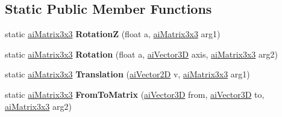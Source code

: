 \subsection*{Static Public Member Functions}
\begin{DoxyCompactItemize}
\item 
\hypertarget{structai_matrix3x3_af9e5446b7a7ad713ef2f2909910f3c0b}{static \hyperlink{structai_matrix3x3}{ai\+Matrix3x3} {\bfseries Rotation\+Z} (float a, \hyperlink{structai_matrix3x3}{ai\+Matrix3x3} arg1)}\label{structai_matrix3x3_af9e5446b7a7ad713ef2f2909910f3c0b}

\item 
\hypertarget{structai_matrix3x3_a3e9bcf32da5e3ea585e8be299d14a541}{static \hyperlink{structai_matrix3x3}{ai\+Matrix3x3} {\bfseries Rotation} (float a, \hyperlink{structai_vector3_d}{ai\+Vector3\+D} axis, \hyperlink{structai_matrix3x3}{ai\+Matrix3x3} arg2)}\label{structai_matrix3x3_a3e9bcf32da5e3ea585e8be299d14a541}

\item 
\hypertarget{structai_matrix3x3_a3a8c415417bad18620693713d1f0f78d}{static \hyperlink{structai_matrix3x3}{ai\+Matrix3x3} {\bfseries Translation} (\hyperlink{structai_vector2_d}{ai\+Vector2\+D} v, \hyperlink{structai_matrix3x3}{ai\+Matrix3x3} arg1)}\label{structai_matrix3x3_a3a8c415417bad18620693713d1f0f78d}

\item 
\hypertarget{structai_matrix3x3_a00a53d9da1dcb51c2be199c348ef2850}{static \hyperlink{structai_matrix3x3}{ai\+Matrix3x3} {\bfseries From\+To\+Matrix} (\hyperlink{structai_vector3_d}{ai\+Vector3\+D} from, \hyperlink{structai_vector3_d}{ai\+Vector3\+D} to, \hyperlink{structai_matrix3x3}{ai\+Matrix3x3} arg2)}\label{structai_matrix3x3_a00a53d9da1dcb51c2be199c348ef2850}

\end{DoxyCompactItemize}
